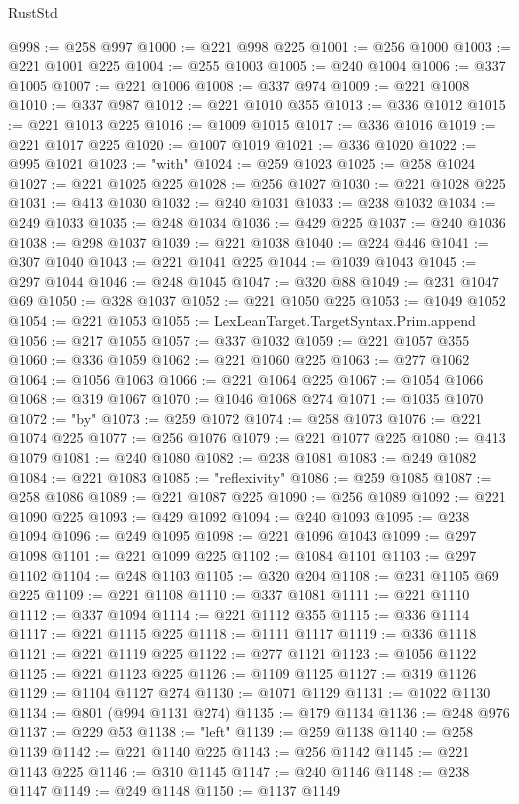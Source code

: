 \begin{lexlean}{RustStd}
\begin{coremodule}
@998 := @258 @997
@1000 := @221 @998 @225
@1001 := @256 @1000
@1003 := @221 @1001 @225
@1004 := @255 @1003
@1005 := @240 @1004
@1006 := @337 @1005
@1007 := @221 @1006
@1008 := @337 @974
@1009 := @221 @1008
@1010 := @337 @987
@1012 := @221 @1010 @355
@1013 := @336 @1012
@1015 := @221 @1013 @225
@1016 := @1009 @1015
@1017 := @336 @1016
@1019 := @221 @1017 @225
@1020 := @1007 @1019
@1021 := @336 @1020
@1022 := @995 @1021
@1023 := "with"
@1024 := @259 @1023
@1025 := @258 @1024
@1027 := @221 @1025 @225
@1028 := @256 @1027
@1030 := @221 @1028 @225
@1031 := @413 @1030
@1032 := @240 @1031
@1033 := @238 @1032
@1034 := @249 @1033
@1035 := @248 @1034
@1036 := @429 @225
@1037 := @240 @1036
@1038 := @298 @1037
@1039 := @221 @1038
@1040 := @224 @446
@1041 := @307 @1040
@1043 := @221 @1041 @225
@1044 := @1039 @1043
@1045 := @297 @1044
@1046 := @248 @1045
@1047 := @320 @88
@1049 := @231 @1047 @69
@1050 := @328 @1037
@1052 := @221 @1050 @225
@1053 := @1049 @1052
@1054 := @221 @1053
@1055 := LexLeanTarget.TargetSyntax.Prim.append
@1056 := @217 @1055
@1057 := @337 @1032
@1059 := @221 @1057 @355
@1060 := @336 @1059
@1062 := @221 @1060 @225
@1063 := @277 @1062
@1064 := @1056 @1063
@1066 := @221 @1064 @225
@1067 := @1054 @1066
@1068 := @319 @1067
@1070 := @1046 @1068 @274
@1071 := @1035 @1070
@1072 := "by"
@1073 := @259 @1072
@1074 := @258 @1073
@1076 := @221 @1074 @225
@1077 := @256 @1076
@1079 := @221 @1077 @225
@1080 := @413 @1079
@1081 := @240 @1080
@1082 := @238 @1081
@1083 := @249 @1082
@1084 := @221 @1083
@1085 := "reflexivity"
@1086 := @259 @1085
@1087 := @258 @1086
@1089 := @221 @1087 @225
@1090 := @256 @1089
@1092 := @221 @1090 @225
@1093 := @429 @1092
@1094 := @240 @1093
@1095 := @238 @1094
@1096 := @249 @1095
@1098 := @221 @1096 @1043
@1099 := @297 @1098
@1101 := @221 @1099 @225
@1102 := @1084 @1101
@1103 := @297 @1102
@1104 := @248 @1103
@1105 := @320 @204
@1108 := @231 @1105 @69 @225
@1109 := @221 @1108
@1110 := @337 @1081
@1111 := @221 @1110
@1112 := @337 @1094
@1114 := @221 @1112 @355
@1115 := @336 @1114
@1117 := @221 @1115 @225
@1118 := @1111 @1117
@1119 := @336 @1118
@1121 := @221 @1119 @225
@1122 := @277 @1121
@1123 := @1056 @1122
@1125 := @221 @1123 @225
@1126 := @1109 @1125
@1127 := @319 @1126
@1129 := @1104 @1127 @274
@1130 := @1071 @1129
@1131 := @1022 @1130
@1134 := @801 (@994 @1131 @274)
@1135 := @179 @1134
@1136 := @248 @976
@1137 := @229 @53
@1138 := "left"
@1139 := @259 @1138
@1140 := @258 @1139
@1142 := @221 @1140 @225
@1143 := @256 @1142
@1145 := @221 @1143 @225
@1146 := @310 @1145
@1147 := @240 @1146
@1148 := @238 @1147
@1149 := @249 @1148
@1150 := @1137 @1149

\end{coremodule}
\end{lexlean}
